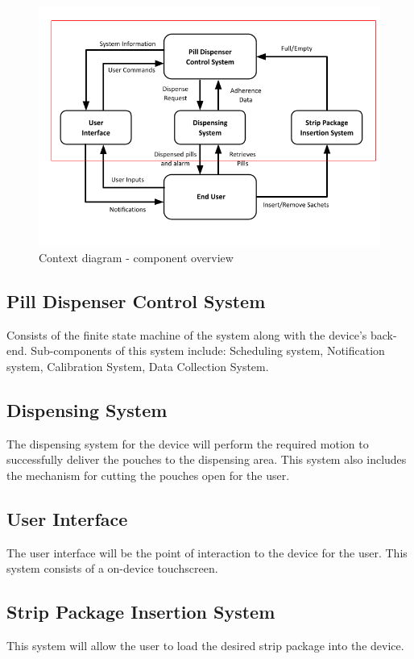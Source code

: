 \documentclass[12pt]{article}
\begin{document}
\begin{figure}[H]
    \includegraphics[width=\textwidth,height=\textheight,keepaspectratio]{./ContextDiagram-HazardAnalysis.png}
    \caption{Context diagram - component overview}
    \label{fig:my_label}
\end{figure}


\subsection{Pill Dispenser Control System}
Consists of the finite state machine of the system along with the device's back-end. Sub-components of this system include: Scheduling system, Notification system, Calibration System, Data Collection System. 
\subsection{Dispensing System}
The dispensing system for the device will perform the required motion to successfully deliver the pouches to the dispensing area. This system also includes the mechanism for cutting the pouches open for the user.
\subsection{User Interface}
The user interface will be the point of interaction to the device for the user. This system consists of a on-device touchscreen.
\subsection{Strip Package Insertion System}
This system will allow the user to load the desired strip package into the device.
\end{document}
